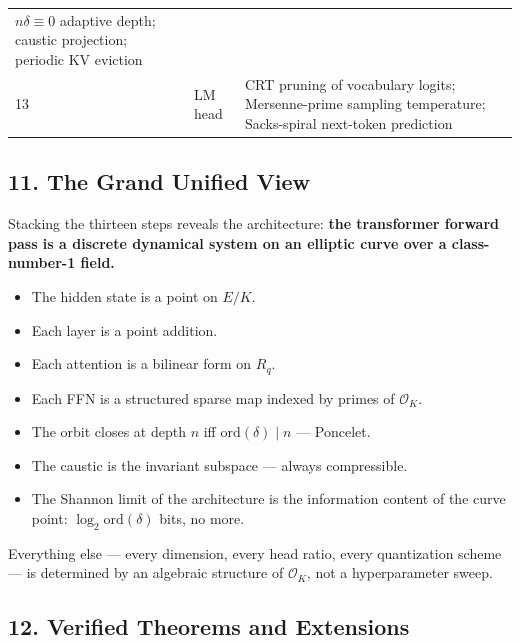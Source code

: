 \documentclass[
  11pt,
]{article}
\providecommand{\tightlist}{%
  \setlength{\itemsep}{0pt}\setlength{\parskip}{0pt}}
\begin{document}
\begin{longtable}[]{@{}lll@{}}
\begin{minipage}[t]{0.66\columnwidth}
\(n\delta \equiv 0\) adaptive depth; caustic projection; periodic KV
eviction\strut
\end{minipage}\tabularnewline
\begin{minipage}[t]{0.08\columnwidth}\raggedright
13\strut
\end{minipage} & \begin{minipage}[t]{0.17\columnwidth}\raggedright
LM head\strut
\end{minipage} & \begin{minipage}[t]{0.66\columnwidth}\raggedright
CRT pruning of vocabulary logits; Mersenne-prime sampling temperature;
Sacks-spiral next-token prediction\strut
\end{minipage}\tabularnewline
\bottomrule
\end{longtable}

\hypertarget{the-grand-unified-view}{%
\subsection{11. The Grand Unified View}\label{the-grand-unified-view}}

Stacking the thirteen steps reveals the architecture: \textbf{the
transformer forward pass is a discrete dynamical system on an elliptic
curve over a class-number-1 field.}

\begin{itemize}
\tightlist
\item
  The hidden state is a point on \(E/K\).
\item
  Each layer is a point addition.
\item
  Each attention is a bilinear form on \(R_q\).
\item
  Each FFN is a structured sparse map indexed by primes of
  \(\mathcal{O}_K\).
\item
  The orbit closes at depth \(n\) iff \(\mathrm{ord}(\delta) \mid n\)
  --- Poncelet.
\item
  The caustic is the invariant subspace --- always compressible.
\item
  The Shannon limit of the architecture is the information content of
  the curve point: \(\log_2 \mathrm{ord}(\delta)\) bits, no more.
\end{itemize}

Everything else --- every dimension, every head ratio, every
quantization scheme --- is determined by an algebraic structure of
\(\mathcal{O}_K\), not a hyperparameter sweep.

\hypertarget{verified-theorems-and-extensions}{%
\subsection{12. Verified Theorems and
Extensions}\label{verified-theorems-and-extensions}}
\end{document}
